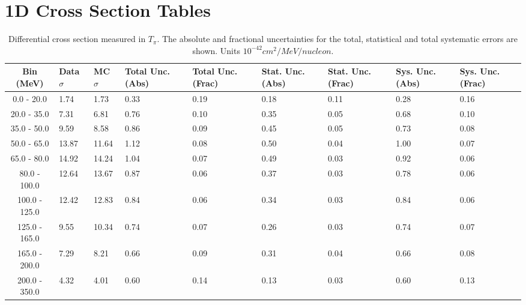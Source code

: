 \chapter{1D Cross Section Tables}
\label{Ap:XsecTables1D}
 

\begin{table}[!htb]
    \centering
    \tiny
    \begin{tabular}{|c|p{0.5in}|p{0.5in}|p{0.5in}|p{0.5in}|p{0.5in}|p{0.5in}|p{0.5in}|p{0.5in}|}
        \hline
        Bin (MeV)& Data $\sigma$ & MC $\sigma$ & Total Unc. (Abs) & Total Unc. (Frac)  & Stat. Unc. (Abs) & Stat. Unc. (Frac) & Sys. Unc. (Abs) & Sys. Unc. (Frac)\\ \hline
0.0 - 20.0 & 1.74 & 1.73 & 0.33 & 0.19 & 0.18 & 0.11 & 0.28 & 0.16\\ \hline
20.0 - 35.0 & 7.31 & 6.81 & 0.76 & 0.10 & 0.35 & 0.05 & 0.68 & 0.10\\ \hline
35.0 - 50.0 & 9.59 & 8.58 & 0.86 & 0.09 & 0.45 & 0.05 & 0.73 & 0.08\\ \hline
50.0 - 65.0 & 13.87 & 11.64 & 1.12 & 0.08 & 0.50 & 0.04 & 1.00 & 0.07\\ \hline
65.0 - 80.0 & 14.92 & 14.24 & 1.04 & 0.07 & 0.49 & 0.03 & 0.92 & 0.06\\ \hline
80.0 - 100.0 & 12.64 & 13.67 & 0.87 & 0.06 & 0.37 & 0.03 & 0.78 & 0.06\\ \hline
100.0 - 125.0 & 12.42 & 12.83 & 0.84 & 0.06 & 0.34 & 0.03 & 0.84 & 0.06\\ \hline
125.0 - 165.0 & 9.55 & 10.34 & 0.74 & 0.07 & 0.26 & 0.03 & 0.74 & 0.07\\ \hline
165.0 - 200.0 & 7.29 & 8.21 & 0.66 & 0.09 & 0.31 & 0.04 & 0.66 & 0.08\\ \hline
200.0 - 350.0 & 4.32 & 4.01 & 0.60 & 0.14 & 0.13 & 0.03 & 0.60 & 0.13\\ \hline


    \end{tabular}
    \caption{Differential cross section measured in $T_\pi$. The absolute and fractional uncertainties for the total, statistical and total systematic errors are shown. Units $10^{-42}cm^2/MeV/nucleon$.}
    \label{tab:ApdxA:XSecTable1Dtpi}
\end{table}

